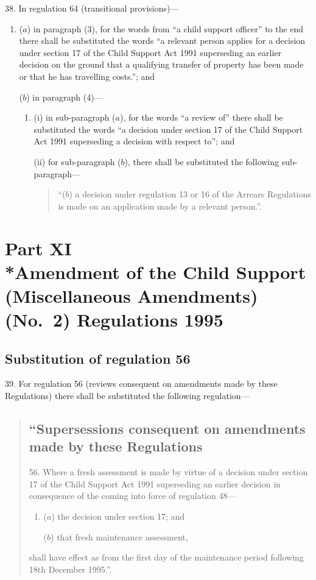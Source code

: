\documentclass[12pt,a4paper]{article}
\begin{document}
38.  In regulation 64 (transitional provisions)—
\begin{enumerate}\item[]
($a$) in paragraph (3), for the words from “a child support officer” to the end there shall be substituted the words “a relevant person applies for a decision under section 17 of the Child Support Act 1991 superseding an earlier decision on the ground that a qualifying transfer of property has been made or that he has travelling costs.”; and

($b$) in paragraph (4)—
\begin{enumerate}\item[]
(i) in sub-paragraph ($a$), for the words “a review of” there shall be substituted the words “a decision under section 17 of the Child Support Act 1991 superseding a decision with respect to”; and

(ii) for sub-paragraph ($b$), there shall be substituted the following sub-paragraph—
\begin{quotation}
“($b$) a decision under regulation 13 or 16 of the Arrears Regulations is made on an application made by a relevant person.”.
\end{quotation}
\end{enumerate}
\end{enumerate}

\section[Part XI --- Amendment of the Child Support (Miscellaneous Amendments) (No.\ 2) Regulations 1995]{Part XI\\*Amendment of the Child Support (Miscellaneous Amendments) (No.\ 2) Regulations 1995}

\renewcommand\parthead{--- Part XI}

\subsection[39. Substitution of regulation 56]{Substitution of regulation 56}

39.  For regulation 56 (reviews consequent on amendments made by these Regulations) there shall be substituted the following regulation—
\begin{quotation}
\subsection*{“Supersessions consequent on amendments made by these Regulations}

56.  Where a fresh assessment is made by virtue of a decision under section 17 of the Child Support Act 1991 superseding an earlier decision in consequence of the coming into force of regulation 48—
\begin{enumerate}\item[]
($a$) the decision under section 17; and

($b$) that fresh maintenance assessment,
\end{enumerate}
shall have effect as from the first day of the maintenance period following 18th December 1995.”.
\end{quotation}
\end{document}
